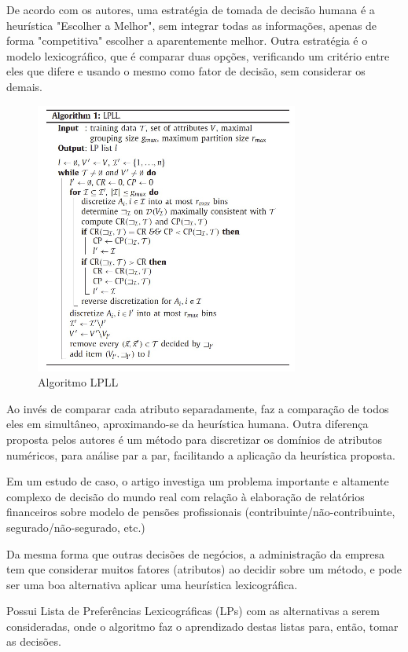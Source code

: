 \documentclass[12pt]{article}
\begin{document}
De acordo com os autores, uma estratégia de tomada de decisão humana é a heurística "Escolher a Melhor", sem integrar todas as informações, apenas de forma "competitiva" escolher a aparentemente melhor.
Outra estratégia é o modelo lexicográfico, que é comparar duas opções, verificando um critério entre eles que difere e usando o mesmo como fator de decisão, sem considerar os demais.

\begin{figure}[h]
	\centering
	\includegraphics[width=.68\textwidth]{lpll.png}
	\caption{Algoritmo LPLL}
	\label{fig:alglpllr}
\end{figure}

Ao invés de comparar cada atributo separadamente, faz a comparação de todos eles em simultâneo, aproximando-se da heurística humana. Outra diferença proposta pelos autores é um método para discretizar os domínios de atributos numéricos, para análise par a par, facilitando a aplicação da heurística proposta.

Em um estudo de caso, o artigo investiga um problema importante e altamente complexo de decisão do mundo real com relação à elaboração de relatórios financeiros sobre modelo de pensões profissionais (contribuinte/não-contribuinte, segurado/não-segurado, etc.)

Da mesma forma que outras decisões de negócios, a administração da empresa tem que considerar muitos fatores (atributos) ao decidir sobre um método, e pode ser uma boa alternativa aplicar uma heurística lexicográfica.

Possui Lista de Preferências Lexicográficas (LPs) com as alternativas a serem consideradas, onde o algoritmo faz o aprendizado destas listas para, então, tomar as decisões.
\end{document}
